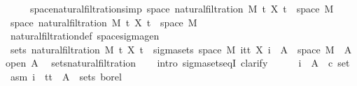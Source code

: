 \begin{isabellebody}
\ \ \ \ \ space{\isacharunderscore}{\kern0pt}natural{\isacharunderscore}{\kern0pt}filtration{\isacharbrackleft}{\kern0pt}simp{\isacharbrackright}{\kern0pt}{\isacharcolon}{\kern0pt}\ {\isachardoublequoteopen}space\ {\isacharparenleft}{\kern0pt}natural{\isacharunderscore}{\kern0pt}filtration\ M\ t\ X\ t{\isacharparenright}{\kern0pt}\ {\isacharequal}{\kern0pt}\ space\ M{\isachardoublequoteclose}\isanewline
%
\isadelimproof
%
\endisadelimproof
%
\isatagproof
{}\isamarkupfalse%
\ {\isacharminus}{\kern0pt}\isanewline
\ \ \isamarkupfalse%
\ {\isachardoublequoteopen}space\ {\isacharparenleft}{\kern0pt}natural{\isacharunderscore}{\kern0pt}filtration\ M\ t\ X\ t{\isacharparenright}{\kern0pt}\ {\isacharequal}{\kern0pt}\ space\ M{\isachardoublequoteclose}\ \isamarkupfalse%
\ natural{\isacharunderscore}{\kern0pt}filtration{\isacharunderscore}{\kern0pt}def\ space{\isacharunderscore}{\kern0pt}sigma{\isacharunderscore}{\kern0pt}gen\ \isacommand{{\isachardot}{\kern0pt}{\isachardot}{\kern0pt}}\isamarkupfalse%
\isanewline
\ \ \isamarkupfalse%
\ {\isachardoublequoteopen}sets\ {\isacharparenleft}{\kern0pt}natural{\isacharunderscore}{\kern0pt}filtration\ M\ t\ X\ t{\isacharparenright}{\kern0pt}\ {\isacharequal}{\kern0pt}\ sigma{\isacharunderscore}{\kern0pt}sets\ {\isacharparenleft}{\kern0pt}space\ M{\isacharparenright}{\kern0pt}\ {\isacharparenleft}{\kern0pt}{\isasymUnion}i{\isasymin}{\isacharbraceleft}{\kern0pt}tt{\isacharbraceright}{\kern0pt}{\isachardot}{\kern0pt}\ {\isacharbraceleft}{\kern0pt}X\ i\ {\isacharminus}{\kern0pt}{\isacharbackquote}{\kern0pt}\ A\ {\isasyminter}\ space\ M\ {\isacharbar}{\kern0pt}\ A{\isachardot}{\kern0pt}\ open\ A{\isacharbraceright}{\kern0pt}{\isacharparenright}{\kern0pt}{\isachardoublequoteclose}\ \isamarkupfalse%
\ sets{\isacharunderscore}{\kern0pt}natural{\isacharunderscore}{\kern0pt}filtration{\isacharprime}{\kern0pt}\isanewline
\ \ \isamarkupfalse%
\ {\isacharparenleft}{\kern0pt}intro\ sigma{\isacharunderscore}{\kern0pt}sets{\isacharunderscore}{\kern0pt}eqI{\isacharcomma}{\kern0pt}\ clarify{\isacharparenright}{\kern0pt}\isanewline
\ \ \ \ \isamarkupfalse%
\ i\ \ A\ {\isacharcolon}{\kern0pt}{\isacharcolon}{\kern0pt}\ {\isachardoublequoteopen}{\isacharprime}{\kern0pt}c\ set{\isachardoublequoteclose}\ \isamarkupfalse%
\ asm{\isacharcolon}{\kern0pt}\ {\isachardoublequoteopen}i\ {\isasymin}\ {\isacharbraceleft}{\kern0pt}tt{\isacharbraceright}{\kern0pt}{\isachardoublequoteclose}\ {\isachardoublequoteopen}\ A\ {\isasymin}\ sets\ borel{\isachardoublequoteclose}\isanewline

\end{isabellebody}
